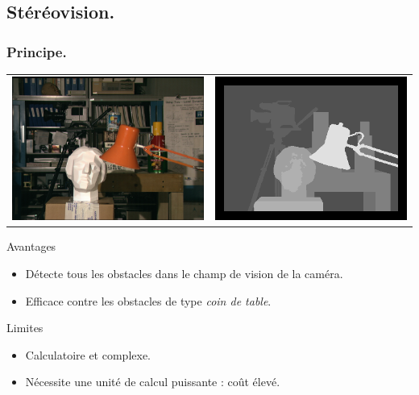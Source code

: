 \subsection{Stéréovision.}
\begin{frame}
    \frametitle{Principe.}
    \begin{tabular}{cc}
        \includegraphics[width=.4\linewidth]{rcs/tsukuba.png} & \includegraphics[width=.4\linewidth]{rcs/tsukuba_disp.png} \\
    \end{tabular}
     { \begin{exampleblock}{Avantages}
            \begin{itemize}
                \pause \item Détecte tous les obstacles dans le champ de vision de la caméra.
                \pause \item Efficace contre les obstacles de type \emph{coin de table}.
            \end{itemize}
    \end{exampleblock} }
     { \begin{alertblock}{Limites}
            \begin{itemize}
                \pause \item Calculatoire et complexe.
                \pause \item Nécessite une unité de calcul puissante : coût élevé.
            \end{itemize}
    \end{alertblock} }
\end{frame}

